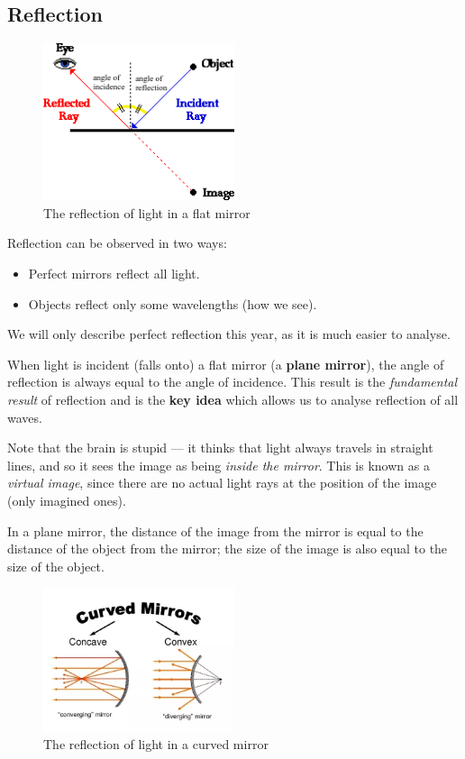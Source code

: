 \documentclass[a4paper]{amsbook}
\newcommand\capcite[1]{}
\begin{document}
\subsection{Reflection}
\begin{figure}
  \centering
  \includegraphics[width=0.5\textwidth]{reflection}
  \caption{The reflection of light in a flat mirror \capcite{http://www.physicsclassroom.com/Class/refln/u13l1c2.gif}\label{fig:reflection}}
\end{figure}
Reflection can be observed in two ways:
\begin{itemize}
  \item Perfect mirrors reflect all light.
  \item Objects reflect only some wavelengths (how we see).
\end{itemize}
We will only describe perfect reflection this year, as it is much easier to analyse.

When light is incident (falls onto) a flat mirror (a \textbf{plane mirror}), the angle of reflection is always equal to the angle
of incidence. This result is the \textit{fundamental result} of reflection and is the \textbf{key idea} which allows us to analyse
reflection of all waves.

Note that the brain is stupid --- it thinks that light always travels in straight lines, and so it sees the image as
being \textit{inside the mirror}. This is known as a \textit{virtual image}, since there are no actual light rays at
the position of the image (only imagined ones).

In a plane mirror, the distance of the image from the mirror is equal to the distance of the object from the mirror; the size
of the image is also equal to the size of the object.

\begin{figure}
  \centering
  \includegraphics[width=0.5\textwidth]{curved}
  \caption{The reflection of light in a curved mirror\\ \capcite{https://qph.ec.quoracdn.net/main-qimg-c84654e146945deec5ee6491cb547873}\label{fig:curved}}
\end{figure}
\end{document}
